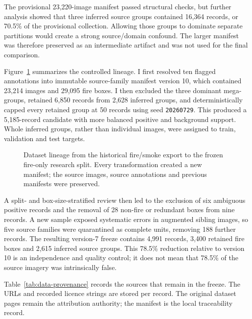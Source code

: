 The provisional 23,220-image manifest passed structural checks, but further
analysis showed that three inferred source groups contained 16,364 records,
or 70.5\% of the provisional collection. Allowing those groups to dominate
separate partitions would create a strong source/domain confound. The larger
manifest was therefore preserved as an intermediate artifact and was not used
for the final comparison.

Figure~\ref{fig:dataset-lineage} summarizes the controlled lineage. I first
resolved ten flagged annotations into immutable source-family manifest version
10, which contained 23,214 images and 29,095 fire boxes. I then excluded the
three dominant mega-groups, retained 6,850 records from 2,628 inferred groups,
and deterministically capped every retained group at 50 records using seed
\texttt{20260729}. This produced a 5,185-record candidate with more balanced
positive and background support. Whole inferred groups, rather than individual
images, were assigned to train, validation and test targets.

\begin{figure}[H]
  \centering
  \resizebox{0.94\textwidth}{!}{}
  \caption{Dataset lineage from the historical fire/smoke export to the frozen
  fire-only research split. Every transformation created a new manifest; the
  source images, source annotations and previous manifests were preserved.}
  \label{fig:dataset-lineage}
\end{figure}

A split- and box-size-stratified review then led to the exclusion of six
ambiguous positive records and the removal of 28 non-fire or redundant boxes
from nine records. A new sample exposed systematic errors in augmented sibling
images, so five source families were quarantined as complete units, removing
188 further records. The resulting version-7 freeze contains 4,991 records,
3,400 retained fire boxes and 2,615 inferred source groups. This 78.5\%
reduction relative to version 10 is an independence and quality control; it
does not mean that 78.5\% of the source imagery was intrinsically false.

Table~\ref{tab:data-provenance} records the sources that remain in the freeze.
The URLs and recorded licence strings are stored per record. The original
dataset pages remain the attribution authority; the manifest is the local
traceability record.

